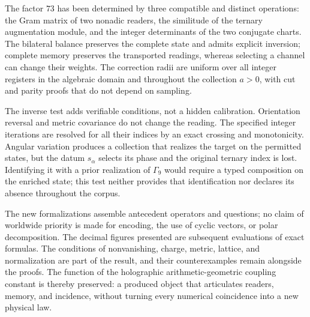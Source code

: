 The factor \(73\) has been determined by three compatible and distinct operations: the Gram matrix of two nonadic readers, the similitude of the ternary augmentation module, and the integer determinants of the two conjugate charts. The bilateral balance preserves the complete state and admits explicit inversion; complete memory preserves the transported readings, whereas selecting a channel can change their weights. The correction radii are uniform over all integer registers in the algebraic domain and throughout the collection \(a>0\), with cut and parity proofs that do not depend on sampling.

The inverse test adds verifiable conditions, not a hidden calibration. Orientation reversal and metric covariance do not change the reading. The specified integer iterations are resolved for all their indices by an exact crossing and monotonicity. Angular variation produces a collection that realizes the target on the permitted states, but the datum \(s_\alpha\) selects its phase and the original ternary index is lost. Identifying it with a prior realization of \(\Gamma_9\) would require a typed composition on the enriched state; this test neither provides that identification nor declares its absence throughout the corpus.

The new formalizations assemble antecedent operators and questions; no claim of worldwide priority is made for encoding, the use of cyclic vectors, or polar decomposition. The decimal figures presented are subsequent evaluations of exact formulas. The conditions of nonvanishing, charge, metric, lattice, and normalization are part of the result, and their counterexamples remain alongside the proofs. The function of the holographic arithmetic-geometric coupling constant is thereby preserved: a produced object that articulates readers, memory, and incidence, without turning every numerical coincidence into a new physical law.
